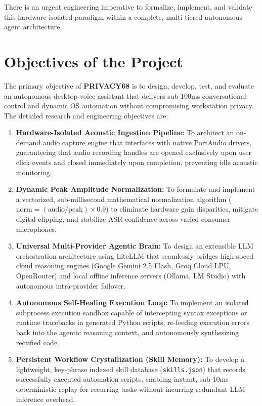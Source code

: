 There is an urgent engineering imperative to formalize, implement, and validate this hardware-isolated paradigm within a complete, multi-tiered autonomous agent architecture.

\section{Objectives of the Project}
The primary objective of \textbf{PRIVACY68} is to design, develop, test, and evaluate an autonomous desktop voice assistant that delivers sub-100ms conversational control and dynamic OS automation without compromising workstation privacy. The detailed research and engineering objectives are:

\begin{enumerate}
    \item \textbf{Hardware-Isolated Acoustic Ingestion Pipeline:} To architect an on-demand audio capture engine that interfaces with native PortAudio drivers, guaranteeing that audio recording handles are opened exclusively upon user click events and closed immediately upon completion, preventing idle acoustic monitoring.
    \item \textbf{Dynamic Peak Amplitude Normalization:} To formulate and implement a vectorized, sub-millisecond mathematical normalization algorithm ($\text{norm} = (\text{audio}/\text{peak}) \times 0.9$) to eliminate hardware gain disparities, mitigate digital clipping, and stabilize ASR confidence across varied consumer microphones.
    \item \textbf{Universal Multi-Provider Agentic Brain:} To design an extensible LLM orchestration architecture using LiteLLM that seamlessly bridges high-speed cloud reasoning engines (Google Gemini 2.5 Flash, Groq Cloud LPU, OpenRouter) and local offline inference servers (Ollama, LM Studio) with autonomous intra-provider failover.
    \item \textbf{Autonomous Self-Healing Execution Loop:} To implement an isolated subprocess execution sandbox capable of intercepting syntax exceptions or runtime tracebacks in generated Python scripts, re-feeding execution errors back into the agentic reasoning context, and autonomously synthesizing rectified code.
    \item \textbf{Persistent Workflow Crystallization (Skill Memory):} To develop a lightweight, key-phrase indexed skill database (\texttt{skills.json}) that records successfully executed automation scripts, enabling instant, sub-10ms deterministic replay for recurring tasks without incurring redundant LLM inference overhead.

\end{enumerate}

